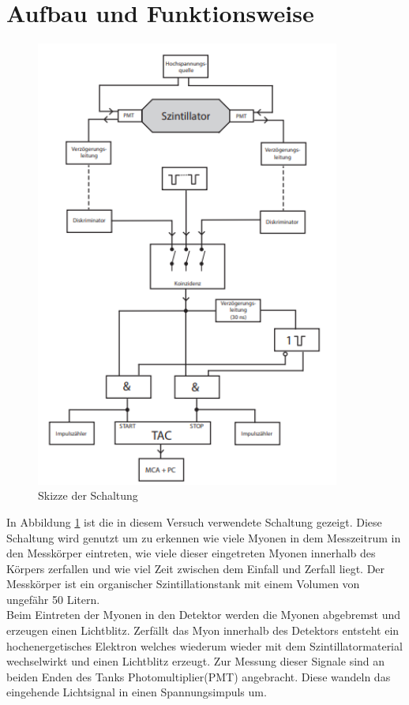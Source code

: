 \newpage
\section{Aufbau und Funktionsweise}

	\begin{figure}
		\includegraphics[width=10cm]{latex/images/Aufbau.png}
		\caption{Skizze der Schaltung \cite{V01}}
		\label{fig:Aufb}
	\end{figure}
    In Abbildung \ref{fig:Aufb} ist die in diesem Versuch verwendete Schaltung gezeigt.
    Diese Schaltung wird genutzt um zu erkennen wie viele Myonen in dem Messzeitrum in den Messkörper eintreten, wie viele dieser eingetreten Myonen innerhalb des Körpers zerfallen und wie viel Zeit zwischen dem Einfall und Zerfall liegt.
    Der Messkörper ist ein organischer Szintillationstank mit einem Volumen von ungefähr 50 Litern.\\
    Beim Eintreten der Myonen in den Detektor werden die Myonen abgebremst und erzeugen einen Lichtblitz.
    Zerfällt das Myon innerhalb des Detektors entsteht ein hochenergetisches Elektron welches wiederum wieder mit dem Szintillatormaterial wechselwirkt und einen Lichtblitz erzeugt.
    Zur Messung dieser Signale sind an beiden Enden des Tanks Photomultiplier(PMT) angebracht. Diese wandeln das eingehende Lichtsignal in einen Spannungsimpuls um. \\
